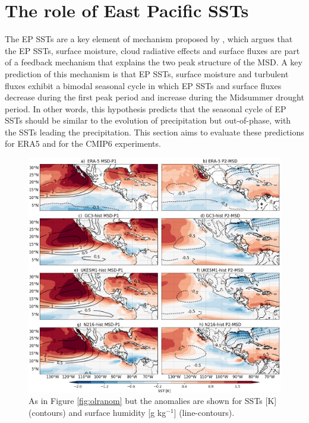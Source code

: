 \section{The role of East Pacific SSTs}

 The EP SSTs are a key element of mechanism proposed by \cite{magana1999}, which argues that the EP SSTs, surface moisture, cloud radiative effects and surface fluxes are part of a feedback mechanism that explains the two peak structure of the MSD. A key prediction of this mechanism is that EP SSTs, surface moisture and turbulent fluxes exhibit a bimodal  seasonal cycle in which EP SSTs and surface fluxes decrease during the first peak period and increase during the Midsummer drought period. In other words, this hypothesis predicts that the seasonal cycle of EP SSTs should be similar to the evolution of precipitation but out-of-phase, with the SSTs leading the precipitation. This section aims to evaluate these predictions for ERA5 and for the CMIP6 experiments. 

\begin{figure}[b!]
\includegraphics[width=\linewidth]{figures/fig4_sstv_3.png}
\caption[Composite SST anomalies]{As in Figure \ref{fig:olranom} but the anomalies are shown for SSTs [K] (contours) and surface humidity [g kg$^{-1}$] (line-contours).  }
\label{fig:msdsstanom}
\end{figure}

